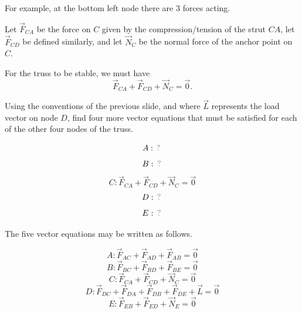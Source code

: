 \begin{applicationActivities}
\begin{remark}
For example, at the bottom left node there are 3 forces acting.

\drawtruss{\trussCForces}

Let \(\vec F_{CA}\) be the force on \(C\) given by the compression/tension
of the strut \(CA\), let \(\vec F_{CD}\) be defined similarly, and let
\(\vec N_C\) be the normal force of the anchor point on \(C\).

\vspace{1em}

For the truss to be stable, we must have
\[
\vec F_{CA}+\vec F_{CD}+\vec N_C=\vec 0
.\]
\end{remark}

\begin{activity}{10}
Using the conventions of the previous slide, and where \(\vec L\)
represents the load vector on node \(D\), find four more vector equations
that must be satisfied for each of the other four nodes of the truss.

\drawtruss

\[
A: \unknown
\]
\[
B: \unknown
\]
\[
C: \vec F_{CA}+\vec F_{CD}+\vec N_C=\vec 0
\]
\[D:\unknown\]
\[E:\unknown\]
\end{activity}

\begin{remark}
The five vector equations may be written as follows.

\drawtruss

\[
A: \vec F_{AC}+\vec F_{AD}+\vec F_{AB}=\vec 0
\]
\[
B: \vec F_{BC}+\vec F_{BD}+\vec F_{BE}=\vec 0
\]
\[
C: \vec F_{CA}+\vec F_{CD}+\vec N_C=\vec 0
\]
\[
D: \vec F_{DC}+\vec F_{DA}+\vec F_{DB} +\vec F_{DE}+\vec L=\vec 0
\]
\[
E: \vec F_{EB}+\vec F_{ED}+\vec N_E=\vec 0
\]
\end{remark}



\end{applicationActivities}

